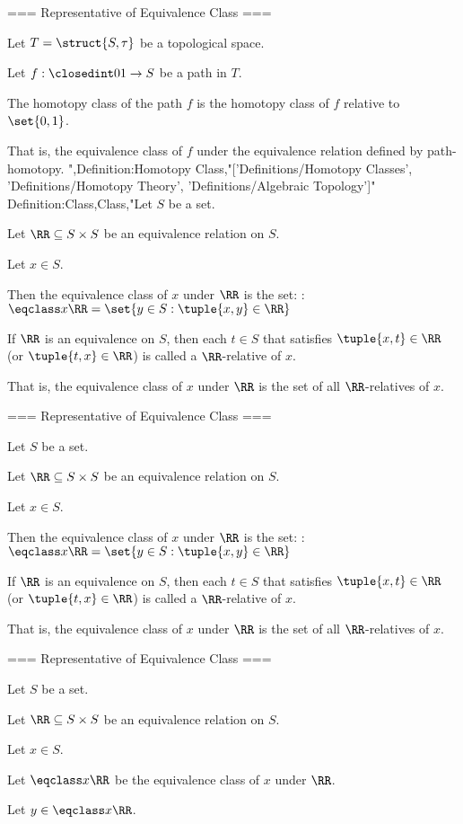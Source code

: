 === Representative of Equivalence Class ===

Let $T = \struct {S, \tau}$ be a topological space.

Let $f: \closedint 0 1 \to S$ be a path in $T$.


The homotopy class of the path $f$ is the homotopy class of $f$ relative to $\set {0, 1}$.


That is, the equivalence class of $f$ under the equivalence relation defined by path-homotopy.
",Definition:Homotopy Class,"['Definitions/Homotopy Classes', 'Definitions/Homotopy Theory', 'Definitions/Algebraic Topology']"
Definition:Class,Class,"Let $S$ be a set.

Let $\RR \subseteq S \times S$ be an equivalence relation on $S$.

Let $x \in S$.


Then the equivalence class of $x$ under $\RR$ is the set:
:$\eqclass x \RR = \set {y \in S: \tuple {x, y} \in \RR}$


If $\RR$ is an equivalence on $S$, then each $t \in S$ that satisfies $\tuple {x, t} \in \RR$ (or $\tuple {t, x} \in \RR$) is called a $\RR$-relative of $x$.


That is, the equivalence class of $x$ under $\RR$ is the set of all $\RR$-relatives of $x$.


=== Representative of Equivalence Class ===

Let $S$ be a set.

Let $\RR \subseteq S \times S$ be an equivalence relation on $S$.

Let $x \in S$.


Then the equivalence class of $x$ under $\RR$ is the set:
:$\eqclass x \RR = \set {y \in S: \tuple {x, y} \in \RR}$


If $\RR$ is an equivalence on $S$, then each $t \in S$ that satisfies $\tuple {x, t} \in \RR$ (or $\tuple {t, x} \in \RR$) is called a $\RR$-relative of $x$.


That is, the equivalence class of $x$ under $\RR$ is the set of all $\RR$-relatives of $x$.


=== Representative of Equivalence Class ===

Let $S$ be a set.

Let $\RR \subseteq S \times S$ be an equivalence relation on $S$.

Let $x \in S$.


Let $\eqclass x \RR$ be the equivalence class of $x$ under $\RR$.

Let $y \in \eqclass x \RR$.

